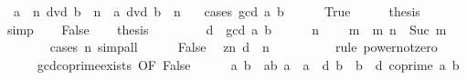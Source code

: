 \begin{isabellebody}
\ \ {\isachardoublequoteopen}a\ {\isacharcircum}{\kern0pt}\ n\ dvd\ b\ {\isacharcircum}{\kern0pt}\ n\ {\isasymlongleftrightarrow}\ a\ dvd\ b{\isachardoublequoteclose}\ \ {\isachardoublequoteopen}n\ {\isachargreater}{\kern0pt}\ {}{\isachardoublequoteclose}\isanewline
%
\isadelimproof
%
\endisadelimproof
%
\isatagproof
{}\isamarkupfalse%
\ {\isacharparenleft}{\kern0pt}cases\ {\isachardoublequoteopen}gcd\ a\ b\ {\isacharequal}{\kern0pt}\ {}{\isachardoublequoteclose}{\isacharparenright}{\kern0pt}\isanewline
\ \ \isamarkupfalse%
\ True\isanewline
\ \ \isamarkupfalse%
\ \isamarkupfalse%
\ {\isacharquery}{\kern0pt}thesis\isanewline
\ \ \ \ \isamarkupfalse%
\ simp\isanewline
{}\isamarkupfalse%
\isanewline
\ \ \isamarkupfalse%
\ False\isanewline
\ \ \isamarkupfalse%
\ {\isacharquery}{\kern0pt}thesis\isanewline
\ \ \isamarkupfalse%
\isanewline
\ \ \ \ \isamarkupfalse%
\ {\isacharquery}{\kern0pt}d\ {\isacharequal}{\kern0pt}\ {\isachardoublequoteopen}gcd\ a\ b{\isachardoublequoteclose}\isanewline
\ \ \ \ \isamarkupfalse%
\ {\isacartoucheopen}n\ {\isachargreater}{\kern0pt}\ {}{\isacartoucheclose}\ \isamarkupfalse%
\ m\ \ m{\isacharcolon}{\kern0pt}\ {\isachardoublequoteopen}n\ {\isacharequal}{\kern0pt}\ Suc\ m{\isachardoublequoteclose}\isanewline
\ \ \ \ \ \ \isamarkupfalse%
\ {\isacharparenleft}{\kern0pt}cases\ n{\isacharparenright}{\kern0pt}\ simp{\isacharunderscore}{\kern0pt}all\isanewline
\ \ \ \ \isamarkupfalse%
\ False\ \isamarkupfalse%
\ zn{\isacharcolon}{\kern0pt}\ {\isachardoublequoteopen}{\isacharquery}{\kern0pt}d\ {\isacharcircum}{\kern0pt}\ n\ {\isasymnoteq}\ {}{\isachardoublequoteclose}\isanewline
\ \ \ \ \ \ \isamarkupfalse%
\ {\isacharparenleft}{\kern0pt}rule\ power{\isacharunderscore}{\kern0pt}not{\isacharunderscore}{\kern0pt}zero{\isacharparenright}{\kern0pt}\isanewline
\ \ \ \ \isamarkupfalse%
\ gcd{\isacharunderscore}{\kern0pt}coprime{\isacharunderscore}{\kern0pt}exists\ {\isacharbrackleft}{\kern0pt}OF\ False{\isacharbrackright}{\kern0pt}\isanewline
\ \ \ \ \isamarkupfalse%
\ a{\isacharprime}{\kern0pt}\ b{\isacharprime}{\kern0pt}\ \ ab{\isacharprime}{\kern0pt}{\isacharcolon}{\kern0pt}\ {\isachardoublequoteopen}a\ {\isacharequal}{\kern0pt}\ a{\isacharprime}{\kern0pt}\ {\isacharasterisk}{\kern0pt}\ {\isacharquery}{\kern0pt}d{\isachardoublequoteclose}\ {\isachardoublequoteopen}b\ {\isacharequal}{\kern0pt}\ b{\isacharprime}{\kern0pt}\ {\isacharasterisk}{\kern0pt}\ {\isacharquery}{\kern0pt}d{\isachardoublequoteclose}\ {\isachardoublequoteopen}coprime\ a{\isacharprime}{\kern0pt}\ b{\isacharprime}{\kern0pt}{\isachardoublequoteclose}\isanewline

\end{isabellebody}

